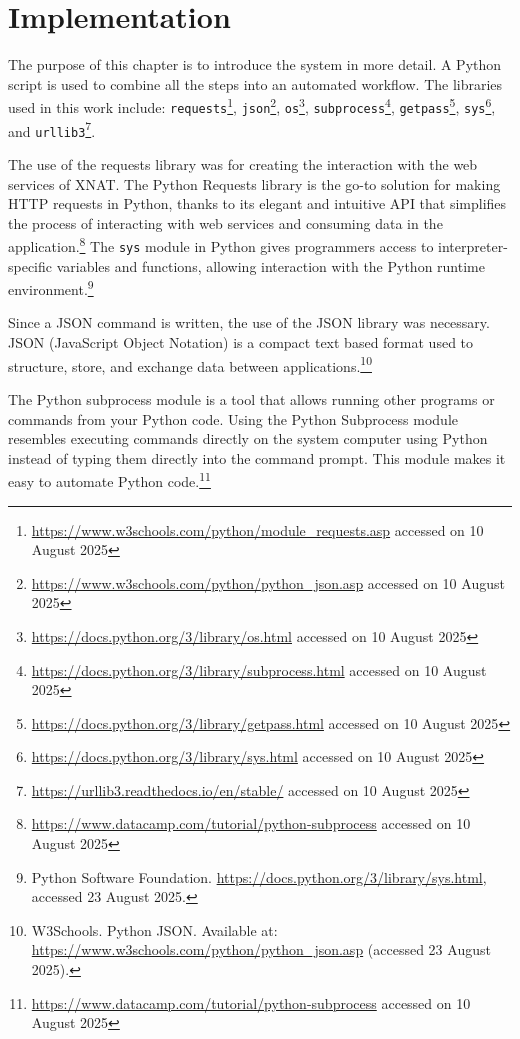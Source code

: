 

\chapter{Implementation}

The purpose of this chapter is to introduce the system in more detail. A Python script is used to combine all the steps into an automated workflow. The libraries used in this work include: \texttt{requests}\footnote{\url{https://www.w3schools.com/python/module_requests.asp} accessed on 10 August 2025}, \texttt{json}\footnote{\url{https://www.w3schools.com/python/python_json.asp} accessed on 10 August 2025}, \texttt{os}\footnote{\url{https://docs.python.org/3/library/os.html} accessed on 10 August 2025}, \texttt{subprocess}\footnote{\url{https://docs.python.org/3/library/subprocess.html} accessed on 10 August 2025}, \texttt{getpass}\footnote{\url{https://docs.python.org/3/library/getpass.html} accessed on 10 August 2025}, \texttt{sys}\footnote{\url{https://docs.python.org/3/library/sys.html} accessed on 10 August 2025}, and \texttt{urllib3}\footnote{\url{https://urllib3.readthedocs.io/en/stable/} accessed on 10 August 2025}.

The use of the requests library was for creating the interaction with the web services of XNAT. The Python Requests library is the go-to solution for making HTTP requests in Python, thanks to its elegant and intuitive API that simplifies the process of interacting with web services and consuming data in the application.\footnote{\url{https://www.datacamp.com/tutorial/python-subprocess} accessed on 10 August 2025} 
The \texttt{sys} module in Python gives programmers access to interpreter-specific variables and functions, allowing interaction with the Python runtime environment.\footnote{Python Software Foundation. \url{https://docs.python.org/3/library/sys.html}, accessed 23 August 2025.}




Since a JSON command is written, the use of the JSON library was necessary. 
JSON (JavaScript Object Notation) is a compact text based
 format used to structure, store, and exchange data between applications.\footnote{W3Schools. Python JSON. Available at: \url{https://www.w3schools.com/python/python_json.asp} (accessed 23 August 2025).}

The Python subprocess module is a tool that allows running other programs or commands from your Python code. Using the Python Subprocess module resembles executing commands directly on the system computer using Python instead of typing them directly into the command prompt. This module makes it easy to automate Python code.\footnote{\url{https://www.datacamp.com/tutorial/python-subprocess} accessed on 10 August 2025}

